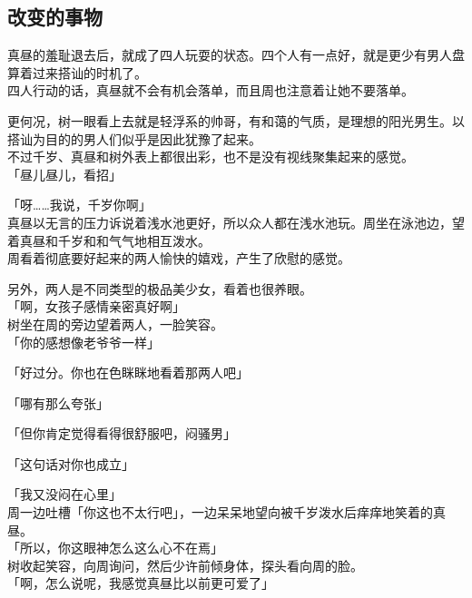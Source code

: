 \subsection{改变的事物}

真昼的羞耻退去后，就成了四人玩耍的状态。四个人有一点好，就是更少有男人盘算着过来搭讪的时机了。\\

四人行动的话，真昼就不会有机会落单，而且周也注意着让她不要落单。

更何况，树一眼看上去就是轻浮系的帅哥，有和蔼的气质，是理想的阳光男生。以搭讪为目的的男人们似乎是因此犹豫了起来。\\

不过千岁、真昼和树外表上都很出彩，也不是没有视线聚集起来的感觉。\\

「昼儿昼儿，看招」

「呀……我说，千岁你啊」\\

真昼以无言的压力诉说着浅水池更好，所以众人都在浅水池玩。周坐在泳池边，望着真昼和千岁和和气气地相互泼水。\\

周看着彻底要好起来的两人愉快的嬉戏，产生了欣慰的感觉。

另外，两人是不同类型的极品美少女，看着也很养眼。\\

「啊，女孩子感情亲密真好啊」\\

树坐在周的旁边望着两人，一脸笑容。\\

「你的感想像老爷爷一样」

「好过分。你也在色眯眯地看着那两人吧」

「哪有那么夸张」

「但你肯定觉得看得很舒服吧，闷骚男」

「这句话对你也成立」

「我又没闷在心里」\\

周一边吐槽「你这也不太行吧」，一边呆呆地望向被千岁泼水后痒痒地笑着的真昼。\\

「所以，你这眼神怎么这么心不在焉」\\

树收起笑容，向周询问，然后少许前倾身体，探头看向周的脸。\\

「啊，怎么说呢，我感觉真昼比以前更可爱了」

